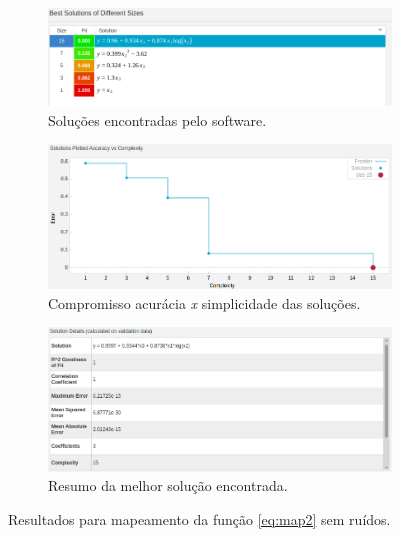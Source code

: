 	\begin{figure}[h!]
	
	\centering
	
		\begin{subfigure}{.45\textwidth} 
		  \centering
		  \includegraphics[width=1\linewidth]{aproximacao/solucoes_map2}
		  \caption{\centering Soluções encontradas pelo software.} 
		  \label{fig:map2_solucoes_s_ruido} 
		\end{subfigure}%
		\begin{subfigure}{.55\textwidth}
		  \centering
		  \includegraphics[width=1\linewidth]{aproximacao/pareto_map2}
		  \caption{\centering Compromisso acurácia \textit{x} simplicidade das
		  soluções.}
		  \label{fig:map2_pareto_s_ruido} 
		\end{subfigure}
	
		\begin{subfigure}{.65\textwidth}
		  \centering
		  \includegraphics[width=1\linewidth]{aproximacao/best_solucao_map2_info}
		  \caption{\centering Resumo da melhor solução encontrada.}
		  \label{fig:map2_best_s_ruido} 
		\end{subfigure}
	
	\caption{Resultados para mapeamento da função \ref{eq:map2} sem ruídos.}
	\end{figure}
	
